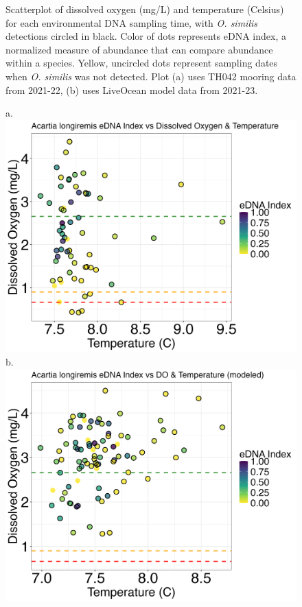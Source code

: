 \documentclass[12pt,twoside]{reedthesis}
\begin{document}
{\begin{figure}[!h]
\begin{center}
			\caption[\textit{O. similis} scatterplot]{\footnotesize{Scatterplot of dissolved oxygen (mg/L) and temperature (Celsius) for each environmental DNA sampling time, with \textit{O. similis} detections circled in black. Color of dots represents eDNA index, a normalized measure of abundance that can compare abundance within a species. Yellow, uncircled dots represent sampling dates when \textit{O. similis} was not detected. Plot (a) uses TH042 mooring data from 2021-22, (b) uses LiveOcean model data from 2021-23.}} %
			\label{OsimilisScatter}
		\end{center}
	\end{figure} 
	
	\begin{figure}[!h]
		\begin{center}
			a. \includegraphics[scale=0.3]{Alongiremis_Scatter_noOut}
			b. \includegraphics[scale=0.3]{Alongiremis_Scatter_AllYr_mod_noOut}

\end{center}
\end{figure}}
\end{document}
